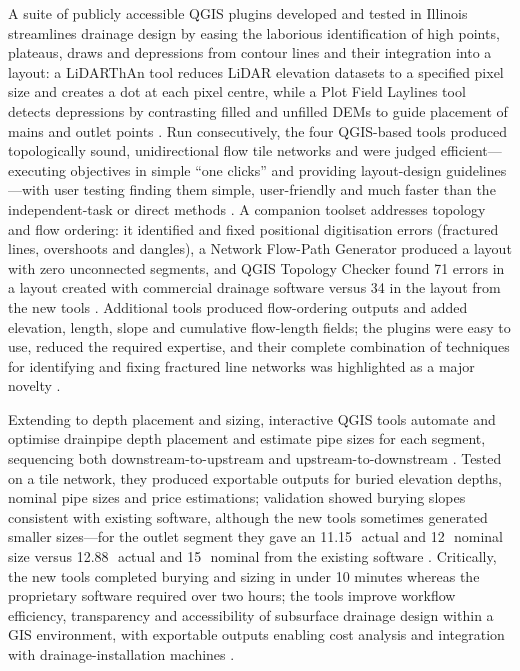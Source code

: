 A suite of publicly accessible QGIS plugins developed and tested in Illinois streamlines drainage design by easing the laborious identification of high points, plateaus, draws and depressions from contour lines and their integration into a layout: a LiDARThAn tool reduces LiDAR elevation datasets to a specified pixel size and creates a dot at each pixel centre, while a Plot Field Laylines tool detects depressions by contrasting filled and unfilled DEMs to guide placement of mains and outlet points \parencite{Falasy2025}. Run consecutively, the four QGIS-based tools produced topologically sound, unidirectional flow tile networks and were judged efficient---executing objectives in simple ``one clicks'' and providing layout-design guidelines---with user testing finding them simple, user-friendly and much faster than the independent-task or direct methods \parencite{Falasy2025}. A companion toolset addresses topology and flow ordering: it identified and fixed positional digitisation errors (fractured lines, overshoots and dangles), a Network Flow-Path Generator produced a layout with zero unconnected segments, and QGIS Topology Checker found 71 errors in a layout created with commercial drainage software versus 34 in the layout from the new tools \parencite{Falasy2024}. Additional tools produced flow-ordering outputs and added elevation, length, slope and cumulative flow-length fields; the plugins were easy to use, reduced the required expertise, and their complete combination of techniques for identifying and fixing fractured line networks was highlighted as a major novelty \parencite{Falasy2024}.

Extending to depth placement and sizing, interactive QGIS tools automate and optimise drainpipe depth placement and estimate pipe sizes for each segment, sequencing both downstream-to-upstream and upstream-to-downstream \parencite{Falasy2025b}. Tested on a tile network, they produced exportable outputs for buried elevation depths, nominal pipe sizes and price estimations; validation showed burying slopes consistent with existing software, although the new tools sometimes generated smaller sizes---for the outlet segment they gave an 11.15\,\textquotedbl\ actual and 12\,\textquotedbl\ nominal size versus 12.88\,\textquotedbl\ actual and 15\,\textquotedbl\ nominal from the existing software \parencite{Falasy2025b}. Critically, the new tools completed burying and sizing in under 10 minutes whereas the proprietary software required over two hours; the tools improve workflow efficiency, transparency and accessibility of subsurface drainage design within a GIS environment, with exportable outputs enabling cost analysis and integration with drainage-installation machines \parencite{Falasy2025b}.

